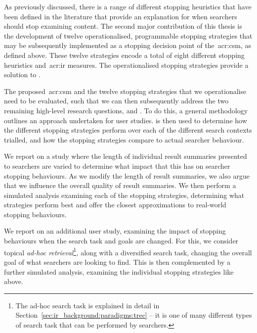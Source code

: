 \noindent
{} As previously discussed, there is a range of different stopping heuristics that have been defined in the literature that provide an explanation for when searchers should stop examining content. The second major contribution of this thesis is the development of twelve operationalised, programmable stopping strategies that may be subsequently implemented as a stopping decision point of the~\gls{acr:csm}, as defined above. These twelve strategies encode a total of eight different stopping heuristics and~\gls{acr:ir} measures. The operationalised stopping strategies provide a solution to .

\noindent
{} The proposed~\gls{acr:csm} and the twelve stopping strategies that we operationalise need to be evaluated, such that we can then subsequently address the two remaining high-level research questions,  and . To do this, a general methodology outlines an approach undertaken for user studies.  is then used to determine how the different stopping strategies perform over each of the different search contexts trialled, and how the stopping strategies compare to actual searcher behaviour.

\noindent
{} We report on a study where the length of individual result summaries presented to searchers are varied to determine what impact that this has on searcher stopping behaviours. As we modify the length of result summaries, we also argue that we influence the overall quality of result summaries. We then perform a simulated analysis examining each of the stopping strategies, determining what strategies perform best and offer the closest approximations to real-world stopping behaviours.

\noindent
{} We report on an additional user study, examining the impact of stopping behaviours when the search task and goals are changed. For this, we consider topical \emph{ad-hoc retrieval}\footnote{The ad-hoc search task is explained in detail in Section~\ref{sec:ir_background:paradigms:trec} -- it is one of many different types of search task that can be performed by searchers.}\emph{,} along with a diversified search task, changing the overall goal of what searchers are looking to find. This is then complemented by a further simulated analysis, examining the individual stopping strategies like above.

